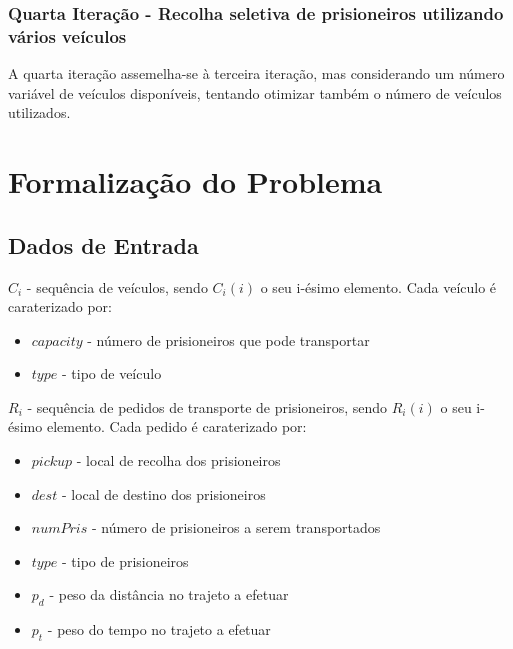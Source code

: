 \documentclass[article, a4paper, 12pt, oneside]{memoir}
\begin{document}
\subsection{Quarta Iteração - Recolha seletiva de prisioneiros utilizando vários veículos}
	A quarta iteração assemelha-se à terceira iteração, mas considerando um número variável de veículos disponíveis, tentando otimizar também o número de veículos utilizados.

\newpage

\chapter[Formalização do Problema][Formalização do Problema]{Formalização do Problema} \label{\thechapter}

\section{Dados de Entrada}

$C_i$ - sequência de veículos, sendo $C_i(i)$ o seu i-ésimo elemento. Cada veículo é caraterizado por:
\begin{itemize}
	\item $capacity$ - número de prisioneiros que pode transportar
	\item $type$ - tipo de veículo
\end{itemize}

$R_i$ - sequência de pedidos de transporte de prisioneiros, sendo $R_i(i)$ o seu i-ésimo elemento. Cada pedido é caraterizado por:
\begin{itemize}
	\item $pickup$ - local de recolha dos prisioneiros
	\item $dest$ - local de destino dos prisioneiros
	\item $numPris$ - número de prisioneiros a serem transportados
	\item $type$ - tipo de prisioneiros
	\item $p_d$ - peso da distância no trajeto a efetuar
	\item $p_t$ - peso do tempo no trajeto a efetuar
\end{itemize}
\end{document}
